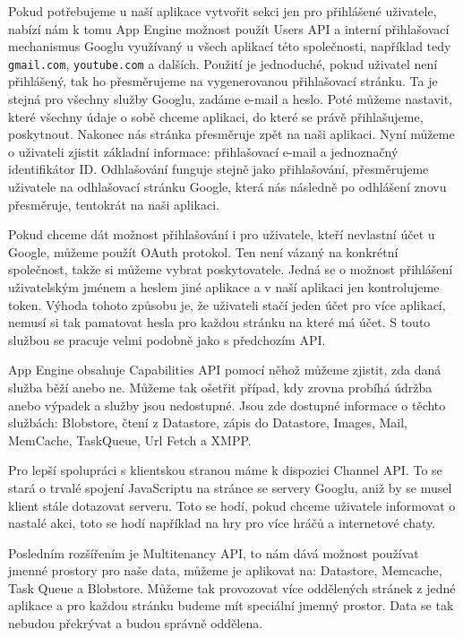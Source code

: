 Pokud potřebujeme u naší aplikace vytvořit sekci jen pro přihlášené uživatele, nabízí nám k tomu App Engine možnost použít Users API a interní přihlašovací mechanismus Googlu využívaný u všech aplikací této společnosti, například tedy \verb|gmail.com|, \verb|youtube.com| a dalších. Použití je jednoduché, pokud uživatel není přihlášený, tak ho přesměrujeme na vygenerovanou přihlašovací stránku. Ta je stejná pro všechny služby Googlu, zadáme e-mail a heslo. Poté můžeme nastavit, které všechny údaje o sobě chceme aplikaci, do které se právě přihlašujeme, poskytnout. Nakonec nás stránka přesměruje zpět na naši aplikaci. Nyní můžeme o uživateli zjistit základní informace: přihlašovací e-mail a jednoznačný identifikátor ID. Odhlašování funguje stejně jako přihlašování, přesměrujeme uživatele na odhlašovací stránku Google, která nás následně po odhlášení znovu přesměruje, tentokrát na naši aplikaci.

Pokud chceme dát možnost přihlašování i pro uživatele, kteří nevlastní účet u Google, můžeme použít OAuth protokol. Ten není vázaný na konkrétní společnost, takže si můžeme vybrat poskytovatele. Jedná se o možnost přihlášení uživatelským jménem a heslem jiné aplikace a v naší aplikaci jen kontrolujeme token. Výhoda tohoto způsobu je, že uživateli stačí jeden účet pro více aplikací, nemusí si tak pamatovat hesla pro každou stránku na které má účet. S touto službou se pracuje velmi podobně jako s předchozím API.

App Engine obsahuje Capabilities API pomocí něhož můžeme zjistit, zda daná služba běží anebo ne. Můžeme tak ošetřit případ, kdy zrovna probíhá údržba anebo výpadek a služby jsou nedostupné. Jsou zde dostupné informace o těchto službách: Blobstore, čtení z Datastore, zápis do Datastore, Images, Mail, MemCache, TaskQueue, Url Fetch a XMPP.

Pro lepší spolupráci s klientskou stranou máme k dispozici Channel API. To se stará o trvalé spojení JavaScriptu na stránce se servery Googlu, aniž by se musel klient stále dotazovat serveru. Toto se hodí, pokud chceme uživatele informovat o nastalé akci, toto se hodí například na hry pro více hráčů a internetové chaty.

Posledním rozšířením je Multitenancy API, to nám dává možnost používat jmenné prostory pro naše data, můžeme je aplikovat na: Datastore, Memcache, Task Queue a Blobstore. Můžeme tak provozovat více oddělených stránek z jedné aplikace a pro každou stránku budeme mít speciální jmenný prostor. Data se tak nebudou překrývat a budou správně oddělena.

